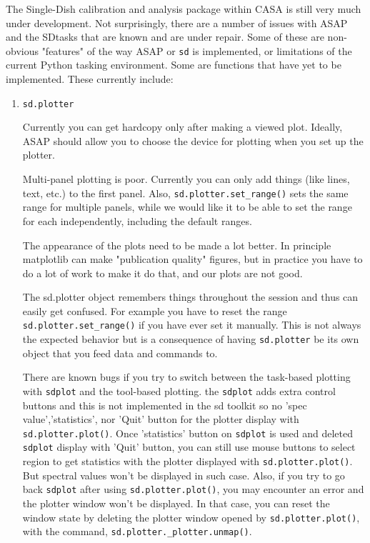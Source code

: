 The Single-Dish calibration and analysis package within CASA is still
very much under development.  Not surprisingly,
there are a number of issues with ASAP and the SDtasks that are known and
are under repair.  Some of these are non-obvious "features" of the way
ASAP or {\tt sd} is implemented, or limitations of the current Python
tasking environment.  Some are functions that have yet to be
implemented.  These currently include: 

\begin{enumerate}

\item {\tt sd.plotter}

  Currently you can get hardcopy only after making a viewed plot.
  Ideally, ASAP should allow you to choose the device for plotting
  when you set up the plotter.

  Multi-panel plotting is poor.  Currently you can only add things
  (like lines, text, etc.) to the first panel.  Also,
  {\tt sd.plotter.set\_range()} sets the same range for multiple panels,
  while we would like it to be able to set the range for each independently,
  including the default ranges.

  The appearance of the plots need to be made a lot better.  In
  principle matplotlib can make "publication quality" figures, but in
  practice you have to do a lot of work to make it do that, and our plots 
  are not good.

  The sd.plotter object remembers things throughout the session
  and thus can easily get confused.  For example you have to
  reset the range {\tt sd.plotter.set\_range()} if you have ever set it
  manually.  This is not always the expected behavior but is a consequence
  of having {\tt sd.plotter} be its own object that you feed data and
  commands to.
  
  There are known bugs if you try to switch between the task-based plotting
  with {\tt sdplot} and the tool-based plotting.
  the {\tt sdplot} adds extra control buttons and this is not implemented
  in the sd toolkit so no 'spec value','statistics', nor 'Quit' button for 
  the plotter display with {\tt sd.plotter.plot()}. Once  
  'statistics' button on {\tt sdplot} is used and deleted {\tt sdplot} 
  display with 'Quit' button, 
  you can still use mouse buttons to select region to get statistics with
  the plotter displayed with {\tt sd.plotter.plot()}. But spectral values won't
  be displayed in such case. Also, if you try to go back {\tt sdplot} 
  after using {\tt sd.plotter.plot()}, you may encounter an error and the plotter
  window won't be displayed. In that case, you can reset the window state by deleting the plotter window
  opened by {\tt sd.plotter.plot()}, with the command, {\tt sd.plotter.\_plotter.unmap()}. 
 


\end{enumerate}
